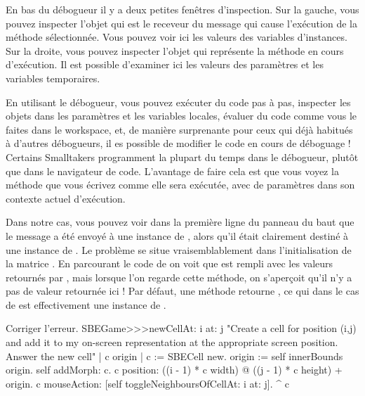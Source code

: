 \documentclass[a4paper,10pt,twoside]{book}
\begin{document}
En bas du débogueur il y a deux petites fenêtres d'inspection. Sur la gauche, vous pouvez inspecter l'objet qui est le receveur du message qui cause l'exécution de la méthode sélectionnée. Vous pouvez voir ici les valeurs des variables d'instances.
Sur la droite, vous pouvez inspecter l'objet qui représente la méthode en cours d'exécution. Il est possible d'examiner ici les valeurs des paramètres et les variables temporaires.

En utilisant le débogueur, vous pouvez exécuter du code pas à pas, inspecter les objets dans les paramètres et les variables locales, évaluer du code comme vous le faites dans le workspace, et, de manière surprenante pour ceux qui déjà habitués à d'autres débogueurs, il es possible de modifier le code en cours de déboguage ! Certains Smalltakers programment la plupart du temps dans le débogueur, plutôt que dans le navigateur de code. L'avantage de faire cela est que vous voyez la méthode que vous écrivez comme elle sera exécutée, avec de paramètres dans son contexte actuel d'exécution.

Dans notre cas, vous pouvez voir dans la première ligne du panneau du baut que le message  a été envoyé à une instance de , alors qu'il était clairement destiné à une instance de .
Le problème se situe vraisemblablement dans l'initialisation de la matrice .
En parcourant le code de  on voit que  est rempli avec les valeurs retournés par , mais lorsque l'on regarde cette méthode, on s'aperçoit qu'il n'y a pas de valeur retournée ici !
Par défaut, une méthode retourne , ce qui dans le cas de  est effectivement une instance de .

\dothis{Fermer la fen\^etre du d\'ebogueur.
Ajouter l'expression ``\ct{^ c}'' à la fin de la méthode \ct{SBEGame>>>newCellAt:at:} de telle sorte quelle retourne \ct{c}.
(Voir \mthref{newCellAt:at:nobug}.)}

\begin{method}{Corriger l'erreur.}
SBEGame>>>newCellAt: i at: j
   "Create a cell for position (i,j) and add it to my on-screen
   representation at the appropriate screen position.  Answer the new cell"
   | c origin |
   c := SBECell new.
   origin := self innerBounds origin.
   self addMorph: c.
   c position: ((i - 1) * c width) @ ((j - 1) * c height) + origin.
   c mouseAction: [self toggleNeighboursOfCellAt: i at: j].
   ^ c
\end{method}
\end{document}
